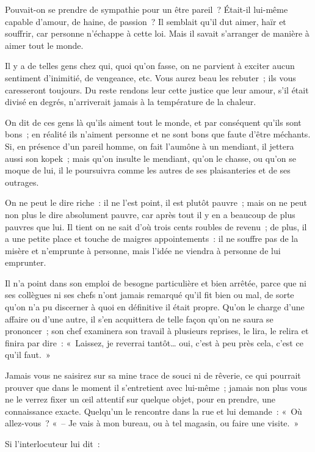 \documentclass[french,twoside]{book} %
\begin{document}
Pouvait-on se prendre de sympathie pour un être pareil ? Était-il lui-même capable d’amour, de haine, de passion ? Il semblait qu’il dut aimer, haïr et souffrir, car personne n’échappe à cette loi. Mais il savait s’arranger de manière à aimer tout le monde.\par
Il y a de telles gens chez qui, quoi qu’on fasse, on ne parvient à exciter aucun sentiment d’inimitié, de vengeance, etc. Vous aurez beau les rebuter ; ils vous caresseront toujours. Du reste rendons leur cette justice que leur amour, s’il était divisé en degrés, n’arriverait jamais à la température de la chaleur.\par
On dit de ces gens là qu’ils aiment tout le monde, et par conséquent qu’ils sont bons ; en réalité ils n’aiment personne et ne sont bons que faute d’être méchants. Si, en présence d’un pareil homme, on fait l’aumône à un mendiant, il jettera aussi son kopek ; mais qu’on insulte le mendiant, qu’on le chasse, ou qu’on se moque de lui, il le poursuivra comme les autres de ses plaisanteries et de ses outrages.\par
On ne peut le dire riche : il ne l’est point, il est plutôt pauvre ; mais on ne peut non plus le dire absolument pauvre, car après tout il y en a beaucoup de plus pauvres que lui. Il tient on ne sait d’où trois cents roubles de revenu ; de plus, il a une petite place et touche de maigres appointements : il ne souffre pas de la misère et n’emprunte à personne, mais l’idée ne viendra à personne de lui emprunter.\par
Il n’a point dans son emploi de besogne particulière et bien arrêtée, parce que ni ses collègues ni ses chefs n’ont jamais remarqué qu’il fit bien ou mal, de sorte qu’on n’a pu discerner à quoi en définitive il était propre. Qu’on le charge d’une affaire ou d’une autre, il s’en acquittera de telle façon qu’on ne saura se prononcer ; son chef examinera son travail à plusieurs reprises, le lira, le relira et finira par dire : « Laissez, je reverrai tantôt… oui, c’est à peu près cela, c’est ce qu’il faut. »\par
Jamais vous ne saisirez sur sa mine trace de souci ni de rêverie, ce qui pourrait prouver que dans le moment il s’entretient avec lui-même ; jamais non plus vous ne le verrez fixer un œil attentif sur quelque objet, pour en prendre, une connaissance exacte. Quelqu’un le rencontre dans la rue et lui demande : « Où allez-vous ? « – Je vais à mon bureau, ou à tel magasin, ou faire une visite. »\par
Si l’interlocuteur lui dit :\par
\end{document}
